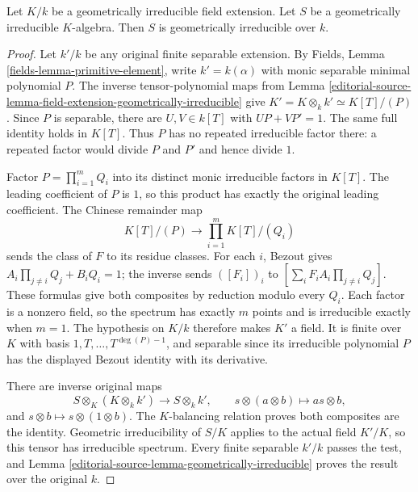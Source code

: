 \begin{lemma}
\label{editorial-source-lemma-geometrically-irreducible-transitive}
Let $K/k$ be a geometrically irreducible field extension.
Let $S$ be a geometrically irreducible $K$-algebra.
Then $S$ is geometrically irreducible over $k$.
\end{lemma}

\begin{proof}
Let $k'/k$ be any original finite
separable extension. By Fields,
Lemma \ref{fields-lemma-primitive-element},
write $k'=k(\alpha)$ with monic
separable minimal polynomial $P$.
The inverse tensor-polynomial maps
from Lemma
\ref{editorial-source-lemma-field-extension-geometrically-irreducible}
give $K'=K\otimes_k k'\simeq K[T]/(P)$.
Since $P$ is separable, there are
$U,V\in k[T]$ with $UP+VP'=1$.
The same full identity holds in
$K[T]$. Thus $P$ has no repeated
irreducible factor there: a repeated
factor would divide $P$ and $P'$
and hence divide $1$.

Factor $P=\prod_{i=1}^m Q_i$ into
its distinct monic irreducible
factors in $K[T]$. The leading
coefficient of $P$ is $1$, so this
product has exactly the original
leading coefficient. The Chinese
remainder map
$$
K[T]/(P)\longrightarrow\prod_{i=1}^m K[T]/(Q_i)
$$
sends the class of $F$ to its residue
classes. For each $i$, Bezout gives
$A_i\prod_{j\ne i}Q_j+B_iQ_i=1$;
the inverse sends $([F_i])_i$ to
$[\sum_i F_i A_i\prod_{j\ne i}Q_j]$.
These formulas give both composites
by reduction modulo every $Q_i$.
Each factor is a nonzero field,
so the spectrum has exactly $m$
points and is irreducible exactly
when $m=1$. The hypothesis on
$K/k$ therefore makes $K'$ a field.
It is finite over $K$ with basis
$1,T,\ldots,T^{\deg(P)-1}$, and
separable since its irreducible
polynomial $P$ has the displayed
Bezout identity with its derivative.

There are inverse original maps
$$
S\otimes_K(K\otimes_k k')\longrightarrow S\otimes_k k',
\qquad s\otimes(a\otimes b)\longmapsto as\otimes b,
$$
and $s\otimes b\mapsto s\otimes(1\otimes b)$.
The $K$-balancing relation proves
both composites are the identity.
Geometric irreducibility of $S/K$
applies to the actual field $K'/K$,
so this tensor has irreducible
spectrum. Every finite separable
$k'/k$ passes the test, and Lemma
\ref{editorial-source-lemma-geometrically-irreducible}
proves the result over the original $k$.
\end{proof}